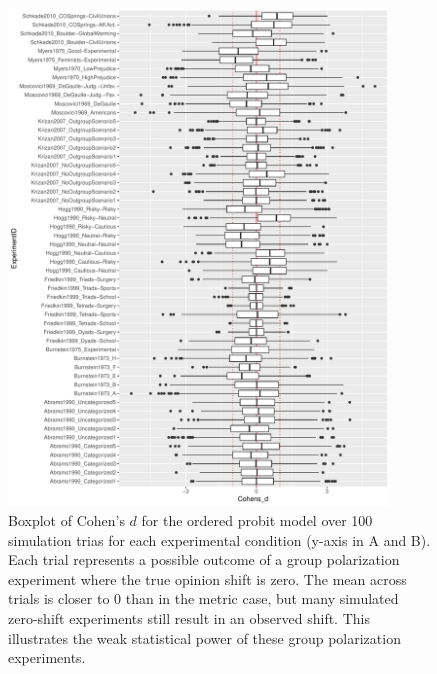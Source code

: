 \documentclass[
  abstract]{article}
\begin{document}
\begin{figure}
  \caption{Boxplot of Cohen's $d$ for the ordered probit model over 100
    simulation trias for each experimental condition (y-axis in A and B). Each
    trial represents a possible outcome of a group polarization experiment where
    the true opinion shift is zero. The mean across trials is closer to 0 than
    in the metric case, but many simulated zero-shift experiments still result in
    an observed shift. This illustrates the weak statistical power of these group
    polarization experiments.}
  \label{fig:OrdinalBoxplot}
  \centering
    \includegraphics[width=0.9\textwidth]{Figures/boxplots/ordinal_cohens.pdf}
\end{figure}
\end{document}
